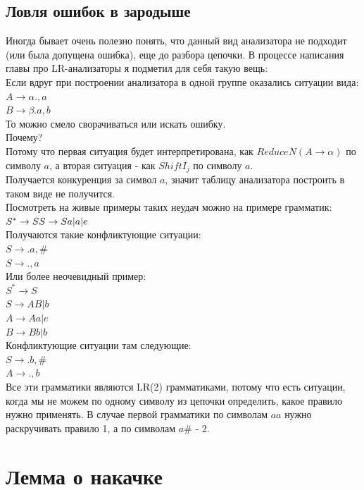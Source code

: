\documentclass[14pt]{extreport}
\begin{document}
	\section{Ловля ошибок в зародыше}
	Иногда бывает очень полезно понять, что данный вид анализатора не подходит (или была допущена
	ошибка), еще до разбора цепочки. В процессе написания главы про LR-анализаторы я подметил для
	себя такую вещь:\\
	Если вдруг при построении анализатора в одной группе оказались ситуации вида:\\
	$ A \to \alpha . , a$\\
	$ B \to \beta . a , b$\\
	То можно смело сворачиваться или искать ошибку.\\
	Почему?\\
	Потому что первая ситуация будет интерпретирована, как $Reduce N(A \to \alpha )$ по
	символу $a$, а вторая ситуация - как $Shift I_j$ по символу $a$.\\
	Получается конкуренция за символ $a$, значит таблицу анализатора построить в таком виде
	не получится.\\
	Посмотреть на живые примеры таких неудач можно на примере грамматик:\\
	$S^* \to S \\ S \to Sa | a | e$ \\
	Получаются такие конфликтующие ситуации:\\
	$ S \to . a , \#$\\
	$ S \to ., a $\\
	Или более неочевидный пример:\\
	$S^* \to S$ \\
	$S \to AB | b$ \\
	$A \to Aa | e$ \\
	$B \to Bb | b$ \\
	Конфликтующие ситуации там следующие:\\
	$ S \to . b , \# $\\
	$ A \to ., b $\\
	
	Все эти грамматики являются LR(2) грамматиками, потому что есть ситуации, когда мы не
	можем по одному символу из цепочки определить, какое правило нужно применять. В случае
	первой грамматики по символам $aa$ нужно раскручивать правило 1, а по символам $a\#$ - 2.\\
	
	
	
	
	
	\chapter{Лемма о накачке}
	
	
	
	
\end{document}
